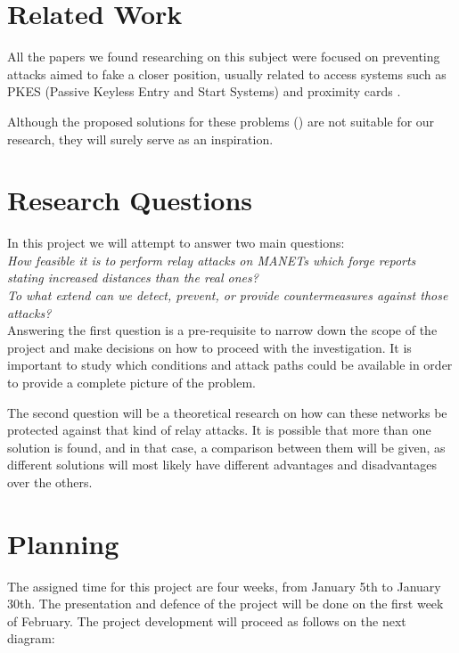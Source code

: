 \documentclass{article}
\begin{document}
\section{Related Work}

All the papers we found researching on this subject were focused on preventing attacks aimed to fake a closer position, usually related to access systems such as PKES (Passive Keyless Entry and Start Systems) \cite{francillon2011relay} and proximity cards \cite{hancke2005practical}.

Although the proposed solutions for these problems (\cite{brands1994distance, rasmussen2010realization}) are not suitable for our research, they will surely serve as an inspiration.


\section{Research Questions}

In this project we will attempt to answer two main questions:\\

\emph{How feasible it is to perform relay attacks on MANETs which forge reports stating increased distances than the real ones?}\\

\emph{To what extend can we detect, prevent, or provide countermeasures against those attacks?}\\

Answering the first question is a pre-requisite to narrow down the scope of the project and make decisions on how to proceed with the investigation. It is important to study which conditions and attack paths could be available in order to provide a complete picture of the problem.

The second question will be a theoretical research on how can these networks be protected against that kind of relay attacks. It is possible that more than one solution is found, and in that case, a comparison between them will be given, as different solutions will most likely have different advantages and disadvantages over the others.


\section{Planning}

The assigned time for this project are four weeks, from January 5th to January 30th. The presentation and defence of the project will be done on the first week of February. The project development will proceed as follows on the next diagram:
\end{document}
